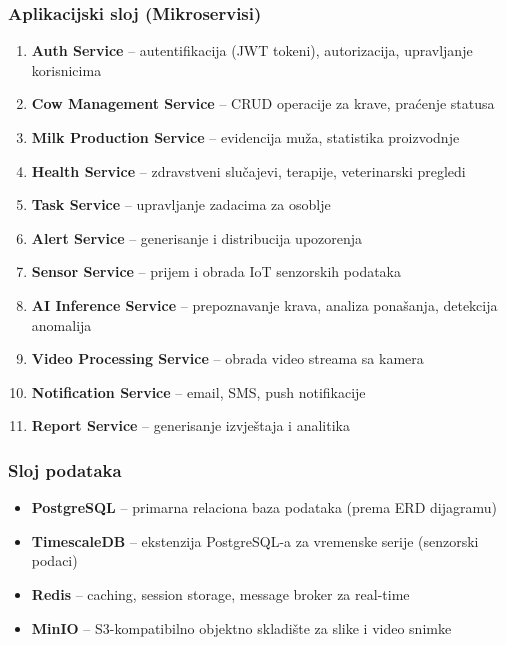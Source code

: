 \documentclass{article}
\begin{document}
\subsubsection{Aplikacijski sloj (Mikroservisi)}

\begin{enumerate}
    \item \textbf{Auth Service} -- autentifikacija (JWT tokeni), autorizacija, upravljanje korisnicima
    \item \textbf{Cow Management Service} -- CRUD operacije za krave, praćenje statusa
    \item \textbf{Milk Production Service} -- evidencija muža, statistika proizvodnje
    \item \textbf{Health Service} -- zdravstveni slučajevi, terapije, veterinarski pregledi
    \item \textbf{Task Service} -- upravljanje zadacima za osoblje
    \item \textbf{Alert Service} -- generisanje i distribucija upozorenja
    \item \textbf{Sensor Service} -- prijem i obrada IoT senzorskih podataka
    \item \textbf{AI Inference Service} -- prepoznavanje krava, analiza ponašanja, detekcija anomalija
    \item \textbf{Video Processing Service} -- obrada video streama sa kamera
    \item \textbf{Notification Service} -- email, SMS, push notifikacije
    \item \textbf{Report Service} -- generisanje izvještaja i analitika
\end{enumerate}

\subsubsection{Sloj podataka}

\begin{itemize}
    \item \textbf{PostgreSQL} -- primarna relaciona baza podataka (prema ERD dijagramu)
    \item \textbf{TimescaleDB} -- ekstenzija PostgreSQL-a za vremenske serije (senzorski podaci)
    \item \textbf{Redis} -- caching, session storage, message broker za real-time
    \item \textbf{MinIO} -- S3-kompatibilno objektno skladište za slike i video snimke
\end{itemize}
\end{document}
